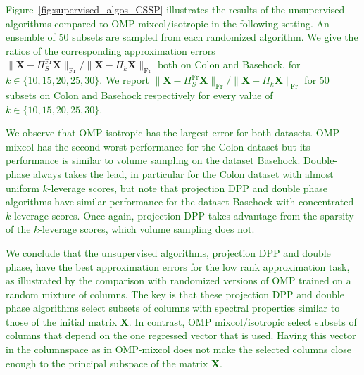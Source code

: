 \documentclass[twoside,11pt]{book}
\newcommand{\rev}[1]{\textcolor{darkgreen}{#1}}
\numberwithin{theorem}{chapter}
\numberwithin{definition}{chapter}
\numberwithin{proposition}{chapter}
\numberwithin{corollary}{chapter}
\numberwithin{example}{chapter}
\numberwithin{lemma}{chapter}
\DeclareMathOperator{\Span}{\mathrm{Span}}
\DeclareMathOperator{\Fr}{\mathrm{Fr}}
\newcommand{\ab}[1]{\textcolor{red}{#1}}
\newcommand{\rb}[1]{\textcolor{magenta}{#1}}
\begin{document}
\rev{Figure~\ref{fig:supervised_algos_CSSP} illustrates the results of the unsupervised algorithms compared to OMP mixcol/isotropic in the following setting. An ensemble of 50 subsets are sampled from each randomized algorithm. We give the ratios of the corresponding approximation errors } $\|\bm{X} - \Pi_{S}^{\Fr}\bm{X}\|_{\Fr}/\|\bm{X} - \Pi_{k}\bm{X}\|_{\Fr}$ \rev{both on Colon and Basehock, for $k \in \{10,15,20,25,30\}$.}
\rev{We report $\|\bm{X} - \Pi_{S}^{\Fr}\bm{X}\|_{\Fr}/\|\bm{X} - \Pi_{k}\bm{X}\|_{\Fr}$ for 50 subsets on Colon and Basehock respectively for every value of $k \in \{10,15,20,25,30\}$.
}

\rev{We observe that OMP-isotropic has the largest error for both datasets. OMP-mixcol has the second worst performance for the Colon dataset but its performance is similar to volume sampling on the dataset Basehock. Double-phase always takes the lead, in particular for the Colon dataset with almost uniform $k$-leverage scores, but note that projection DPP and double phase algorithms have similar performance for the dataset Basehock with concentrated $k$-leverage scores. Once again, projection DPP takes advantage from the sparsity of the $k$-leverage scores, which volume sampling does not.}

\rev{We conclude that the unsupervised algorithms, projection DPP and double phase, have the best approximation errors for the low rank approximation task, as illustrated by the comparison with randomized versions of OMP trained on a random mixture of columns. The key is that these projection DPP and double phase algorithms select subsets of columns with spectral properties similar to those of the initial matrix $\bm{X}$. In contrast, OMP mixcol/isotropic select subsets of columns that depend on the one regressed vector that is used. Having this vector in the columnspace as in OMP-mixcol does not make the selected columns close enough to the principal subspace of the matrix $\bm{X}$.}

\end{document}

